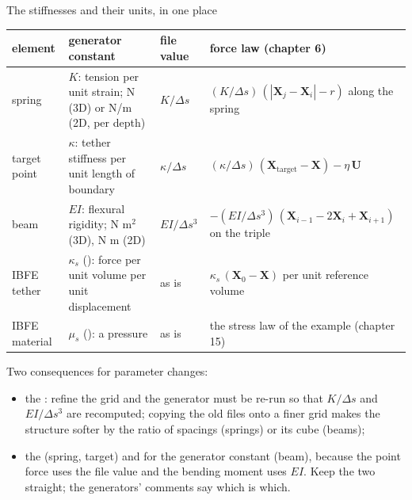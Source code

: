 \documentclass[aspectratio=169,11pt]{beamer}
\begin{document}
\begin{frame}{The stiffnesses and their units, in one place}
\label{fr:unitsk}
\scriptsize
\setlength{\tabcolsep}{3pt}
\begin{tabular}{@{}L{0.15\textwidth}L{0.24\textwidth}L{0.2\textwidth}L{0.3\textwidth}@{}}
\toprule
element & generator constant & file value & force law (chapter 6)\\
\midrule
spring & $K$: tension per unit strain; N (3D) or N/m (2D, per depth) & $K/\Delta s$ & $(K/\Delta s)\,(|\mathbf{X}_j - \mathbf{X}_i| - r)$ along the spring\\
target point & $\kappa$: tether stiffness per unit length of boundary & $\kappa/\Delta s$ & $(\kappa/\Delta s)\,(\mathbf{X}_{\mathrm{target}} - \mathbf{X}) - \eta\,\mathbf{U}$\\
beam & $EI$: flexural rigidity; N m$^2$ (3D), N m (2D) & $EI/\Delta s^3$ & $-(EI/\Delta s^3)\,(\mathbf{X}_{i-1} - 2\mathbf{X}_i + \mathbf{X}_{i+1})$ on the triple\\
IBFE tether & $\kappa_s$ (): force per unit volume per unit displacement & as is & $\kappa_s\,(\mathbf{X}_0 - \mathbf{X})$ per unit reference volume\\
IBFE material & $\mu_s$ (): a pressure & as is & the stress law of the example (chapter 15)\\
\bottomrule
\end{tabular}

\vspace{2mm}
\small Two consequences for parameter changes:
\begin{itemize}
  \item the : refine the grid and the generator must be re-run so that $K/\Delta s$ and $EI/\Delta s^3$ are recomputed; copying the old files onto a finer grid makes the structure softer by the ratio of spacings (springs) or its cube (beams);
  \item the  (spring, target) and for the generator constant (beam), because the point force uses the file value and the bending moment uses $EI$. Keep the two straight; the generators' comments say which is which.
\end{itemize}
\end{frame}
\end{document}
